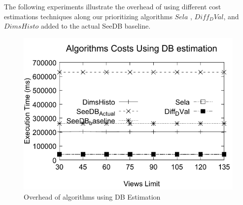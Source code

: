 
  
  The following experiments illustrate the overhead of using different cost 
  estimations techniques along our prioritizing algorithms $Sela$ , $Diff_DVal$, and $DimsHisto$  
  added to the actual SeeDB baseline.
  \begin{figure}
	\centering
 	 \includegraphics[width=.8\textwidth]{Cost21.pdf}
		 	\caption{Overhead of algorithms using DB Estimation}
	\label{fig:figCost12}
  \end{figure}


  




